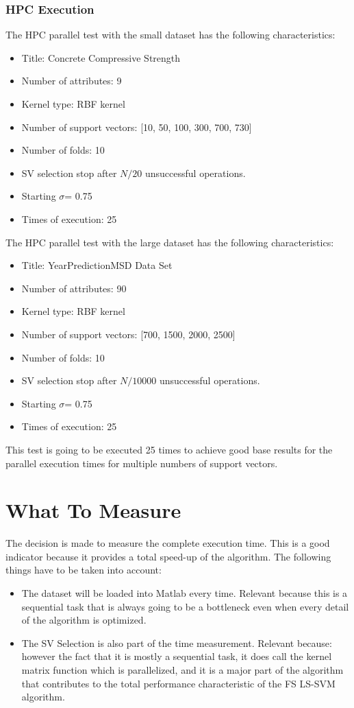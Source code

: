 \subsubsection{HPC Execution}
The HPC parallel test with the small dataset has the following characteristics:
\begin{itemize}
	\item Title: Concrete Compressive Strength\cite{UCIMachi66:online}
	\item Number of attributes: 9
	\item Kernel type: RBF kernel
	\item Number of support vectors: [10, 50, 100, 300, 700, 730]
	\item Number of folds: 10
	\item SV selection stop after $N/20$ unsuccessful operations.
	\item Starting $\sigma$= 0.75
	\item Times of execution: 25
\end{itemize}
The HPC parallel test with the large dataset has the following characteristics:
\begin{itemize}
	\item Title: YearPredictionMSD Data Set\cite{UCIMachi93:online}
	\item Number of attributes: 90
	\item Kernel type: RBF kernel
	\item Number of support vectors: [700, 1500, 2000, 2500]
	\item Number of folds: 10
	\item SV selection stop after $N/10000$ unsuccessful operations.
	\item Starting $\sigma$= 0.75
	\item Times of execution: 25
\end{itemize}
This test is going to be executed 25 times to achieve good base results for the parallel execution times for multiple numbers of support vectors.
\section{What To Measure}
The decision is made to measure the complete execution time.
This is a good indicator because it provides a total speed-up of the algorithm. 
The following things have to be taken into account:
\begin{itemize}
	\item The dataset will be loaded into Matlab every time. Relevant because this is a sequential task that is always going to be a bottleneck even when every detail of the algorithm is optimized.
	\item The SV Selection is also part of the time measurement. Relevant because: however the fact that it is mostly a sequential task, it does call the kernel matrix function which is parallelized, and it is a major part of the algorithm that contributes to the total performance characteristic of the FS LS-SVM algorithm.
\end{itemize}
